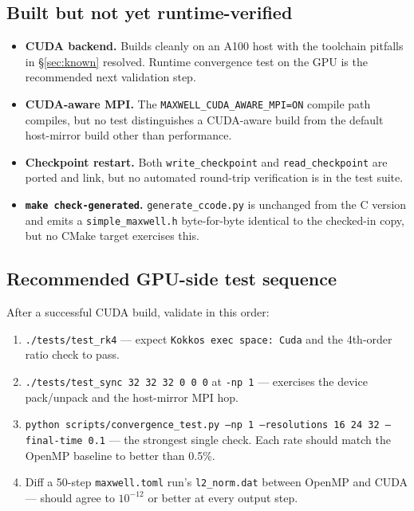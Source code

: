 \documentclass[11pt]{article}
\begin{document}
\subsection{Built but not yet runtime-verified}

\begin{itemize}[itemsep=2pt,topsep=2pt]
  \item \textbf{CUDA backend.}  Builds cleanly on an A100 host
        with the toolchain pitfalls in \S\ref{sec:known} resolved.
        Runtime convergence test on the GPU is the recommended
        next validation step.
  \item \textbf{CUDA-aware MPI.}  The
        \texttt{MAXWELL\_CUDA\_AWARE\_MPI=ON} compile path
        compiles, but no test distinguishes a CUDA-aware build
        from the default host-mirror build other than performance.
  \item \textbf{Checkpoint restart.}  Both
        \texttt{write\_checkpoint} and \texttt{read\_checkpoint}
        are ported and link, but no automated round-trip
        verification is in the test suite.
  \item \textbf{\texttt{make check-generated}.}
        \texttt{generate\_ccode.py} is unchanged from the C
        version and emits a \texttt{simple\_maxwell.h}
        byte-for-byte identical to the checked-in copy, but no
        CMake target exercises this.
\end{itemize}

\subsection{Recommended GPU-side test sequence}

After a successful CUDA build, validate in this order:
\begin{enumerate}[itemsep=2pt,topsep=2pt]
  \item \texttt{./tests/test\_rk4} --- expect
        \texttt{Kokkos exec space: Cuda} and the 4th-order ratio
        check to pass.
  \item \texttt{./tests/test\_sync 32 32 32 0 0 0} at
        \texttt{-np 1} --- exercises the device pack/unpack and
        the host-mirror MPI hop.
  \item \texttt{python scripts/convergence\_test.py --np 1
        --resolutions 16 24 32 --final-time 0.1} --- the strongest
        single check.  Each rate should match the OpenMP
        baseline to better than 0.5\%.
  \item Diff a 50-step \texttt{maxwell.toml} run's
        \texttt{l2\_norm.dat} between OpenMP and CUDA --- should
        agree to $10^{-12}$ or better at every output step.
\end{enumerate}
\end{document}
